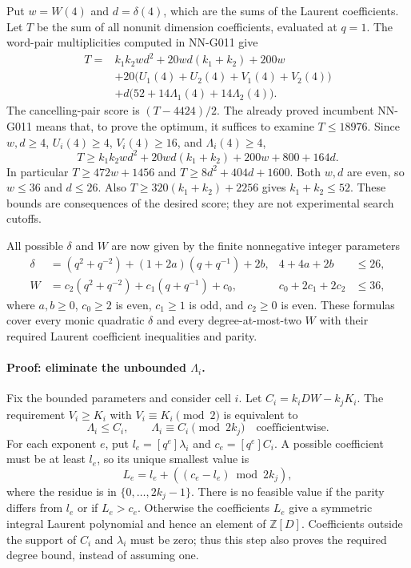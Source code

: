 Put $w=W(4)$ and $d=\delta(4)$, which are the sums of
the Laurent coefficients. Let $T$ be the sum of all
nonunit dimension coefficients, evaluated at $q=1$.
The word-pair multiplicities computed in NN-G011 give
\[
\begin{split}
T={}&k_1k_2wd^2+20wd(k_1+k_2)+200w\\
 &+20\bigl(U_1(4)+U_2(4)+V_1(4)+V_2(4)\bigr)\\
 &+d\bigl(52+14\Lambda_1(4)+14\Lambda_2(4)\bigr).
\end{split}                                                \tag{G019.4}
\]
The cancelling-pair score is $(T-4424)/2$. The already
proved incumbent NN-G011 means that, to prove the optimum,
it suffices to examine $T\le18976$. Since $w,d\ge4$,
$U_i(4)\ge4$, $V_i(4)\ge16$, and $\Lambda_i(4)\ge4$,
\[
T\ge k_1k_2wd^2+20wd(k_1+k_2)+200w+800+164d.
\tag{G019.5}
\]
In particular $T\ge472w+1456$ and
$T\ge8d^2+404d+1600$. Both $w,d$ are even, so
$w\le36$ and $d\le26$. Also
$T\ge320(k_1+k_2)+2256$ gives $k_1+k_2\le52$.
These bounds are consequences of the desired score;
they are not experimental search cutoffs.

All possible $\delta$ and $W$ are now given by the finite
nonnegative integer parameters
\[
\begin{aligned}
\delta&=(q^2+q^{-2})+(1+2a)(q+q^{-1})+2b,
       &4+4a+2b&\le26,\\
W&=c_2(q^2+q^{-2})+c_1(q+q^{-1})+c_0,
       &c_0+2c_1+2c_2&\le36,
\end{aligned}
\]
where $a,b\ge0$, $c_0\ge2$ is even, $c_1\ge1$ is
odd, and $c_2\ge0$ is even. These formulas cover every
monic quadratic $\delta$ and every degree-at-most-two $W$
with their required Laurent coefficient inequalities and parity.

\paragraph{Proof: eliminate the unbounded $\Lambda_i$.}
Fix the bounded parameters and consider cell $i$.
Let $C_i=k_iDW-k_jK_i$. The requirement
$V_i\ge K_i$ with $V_i\equiv K_i\pmod2$ is equivalent to
\[
\Lambda_i\le C_i,\qquad
\Lambda_i\equiv C_i\pmod{2k_j}
\quad\text{coefficientwise}.
\]
For each exponent $e$, put $l_e=[q^e]\lambda_i$ and
$c_e=[q^e]C_i$. A possible coefficient must be at least
$l_e$, so its unique smallest value is
\[
L_e=l_e+((c_e-l_e)\bmod 2k_j),
\tag{G019.6}
\]
where the residue is in $\{0,\ldots,2k_j-1\}$.
There is no feasible value if the parity differs from
$l_e$ or if $L_e>c_e$. Otherwise the coefficients $L_e$
give a symmetric integral Laurent polynomial and hence an
element of $\mathbb Z[D]$. Coefficients outside the support
of $C_i$ and $\lambda_i$ must be zero; thus this step also
proves the required degree bound, instead of assuming one.

